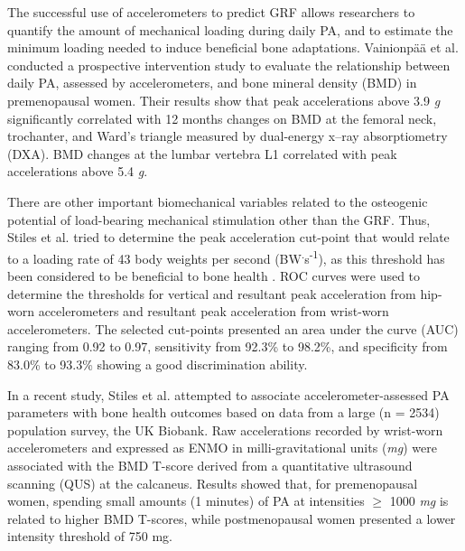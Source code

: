 \documentclass[12pt]{article}
\begin{document}
The successful use of accelerometers to predict GRF allows researchers to quantify the amount of mechanical loading during daily PA, and to estimate the minimum loading needed to induce beneficial bone adaptations. Vainionp{\"{a}}{\"{a}} et al.  conducted a prospective intervention study to evaluate the relationship between daily PA, assessed by accelerometers, and bone mineral density (BMD) in premenopausal women. Their results show that peak accelerations above 3.9 \textit{g} significantly correlated with 12 months changes on BMD at the femoral neck, trochanter, and Ward's triangle measured by dual-energy x–ray absorptiometry (DXA). BMD changes at the lumbar vertebra L1 correlated with peak accelerations above 5.4 \textit{g}.

There are other important biomechanical variables related to the osteogenic potential of load-bearing mechanical stimulation other than the GRF. Thus, Stiles et al.  tried to determine the peak acceleration cut-point that would relate to a loading rate of 43 body weights per second (BW\textsuperscript{.}s\textsuperscript{-1}), as this threshold has been considered to be beneficial to bone health . ROC curves were used to determine the thresholds for vertical and resultant peak acceleration from hip-worn accelerometers and resultant peak acceleration from wrist-worn accelerometers. The selected cut-points presented an area under the curve (AUC) ranging from 0.92 to 0.97, sensitivity from 92.3\% to 98.2\%, and specificity from 83.0\% to 93.3\% showing a good discrimination ability.

In a recent study, Stiles et al.  attempted to associate accelerometer-assessed PA parameters with bone health outcomes based on data from a large (n = 2534) population survey, the UK Biobank. Raw accelerations recorded by wrist-worn accelerometers and expressed as ENMO in milli-gravitational units (\textit{mg}) were associated with the BMD T-score derived from a quantitative ultrasound scanning (QUS) at the calcaneus. Results showed that, for premenopausal women, spending small amounts (1 minutes) of PA at intensities $\geq$ 1000 \textit{mg} is related to higher BMD T-scores, while postmenopausal women presented a lower intensity threshold of 750 mg.
\end{document}
